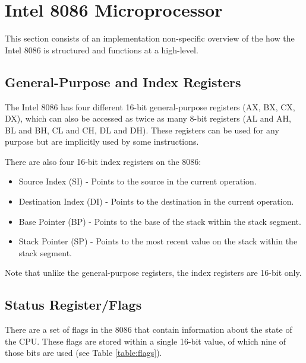 \section{Intel 8086 Microprocessor}

This section consists of an implementation non-specific overview of the how the Intel 8086 is structured and functions at a high-level.

\subsection{General-Purpose and Index Registers}
    The Intel 8086 has four different 16-bit general-purpose registers (AX, BX, CX, DX), which can also be accessed as twice as many 8-bit registers (AL and AH, BL and BH, CL and CH, DL and DH). These registers can be used for any purpose but are implicitly used by some instructions.

    There are also four 16-bit index registers on the 8086:
    \begin{itemize}
        \item Source Index (SI) - Points to the source in the current operation.
        \item Destination Index (DI) - Points to the destination in the current operation.
        \item Base Pointer (BP) - Points to the base of the stack within the stack segment.
        \item Stack Pointer (SP) - Points to the most recent value on the stack within the stack segment.
    \end{itemize}
    Note that unlike the general-purpose registers, the index registers are 16-bit only.

\subsection{Status Register/Flags}
    There are a set of flags in the 8086 that contain information about the state of the CPU. These flags are stored within a single 16-bit value, of which nine of those bits are used (see Table \ref{table:flags}).


